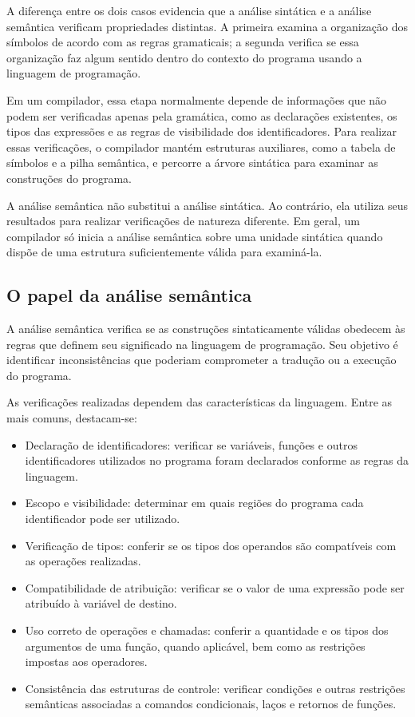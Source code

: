 \documentclass[
  brazilian,
  letterpaper,
]{book}
\providecommand{\tightlist}{%
  \setlength{\itemsep}{0pt}\setlength{\parskip}{0pt}}
\theoremstyle{plain}
\theoremstyle{definition}
\theoremstyle{remark}
\begin{document}
A diferença entre os dois casos evidencia que a análise sintática e a
análise semântica verificam propriedades distintas. A primeira examina a
organização dos símbolos de acordo com as regras gramaticais; a segunda
verifica se essa organização faz algum sentido dentro do contexto do
programa usando a linguagem de programação.

Em um compilador, essa etapa normalmente depende de informações que não
podem ser verificadas apenas pela gramática, como as declarações
existentes, os tipos das expressões e as regras de visibilidade dos
identificadores. Para realizar essas verificações, o compilador mantém
estruturas auxiliares, como a tabela de símbolos e a pilha semântica, e
percorre a árvore sintática para examinar as construções do programa.

A análise semântica não substitui a análise sintática. Ao contrário, ela
utiliza seus resultados para realizar verificações de natureza
diferente. Em geral, um compilador só inicia a análise semântica sobre
uma unidade sintática quando dispõe de uma estrutura suficientemente
válida para examiná-la.

\subsection{O papel da análise
semântica}\label{o-papel-da-anuxe1lise-semuxe2ntica}

A análise semântica verifica se as construções sintaticamente válidas
obedecem às regras que definem seu significado na linguagem de
programação. Seu objetivo é identificar inconsistências que poderiam
comprometer a tradução ou a execução do programa.

As verificações realizadas dependem das características da linguagem.
Entre as mais comuns, destacam-se:

\begin{itemize}
\tightlist
\item
  Declaração de identificadores: verificar se variáveis, funções e
  outros identificadores utilizados no programa foram declarados
  conforme as regras da linguagem.
\item
  Escopo e visibilidade: determinar em quais regiões do programa cada
  identificador pode ser utilizado.
\item
  Verificação de tipos: conferir se os tipos dos operandos são
  compatíveis com as operações realizadas.
\item
  Compatibilidade de atribuição: verificar se o valor de uma expressão
  pode ser atribuído à variável de destino.
\item
  Uso correto de operações e chamadas: conferir a quantidade e os tipos
  dos argumentos de uma função, quando aplicável, bem como as restrições
  impostas aos operadores.
\item
  Consistência das estruturas de controle: verificar condições e outras
  restrições semânticas associadas a comandos condicionais, laços e
  retornos de funções.
\end{itemize}
\end{document}
